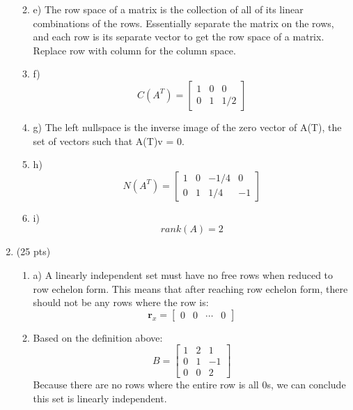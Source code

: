 \documentclass[11pt]{article}
\begin{document}
\begin{enumerate}
\begin{enumerate}
        \vskip 06pt
        \item e) The row space of a matrix is the collection of all of its linear combinations of the rows. Essentially separate the matrix on the rows, and each row is its separate vector to get the row space of a matrix. Replace row with column for the column space. 

        \vskip 06pt
        \item f)
        $$
        C(A^{T}) = \begin{bmatrix} 1 & 0 & 0 \\  0 & 1 & 1/2 \end{bmatrix}
        $$
        
        \vskip 06pt
        \item g) The left nullspace is the inverse image of the zero vector of A(T), the set of vectors such that A(T)v = 0.
        
        \vskip 06pt
        \item h)
        $$
        N(A^{T}) = \begin{bmatrix} 1 & 0 & -1/4 & 0 \\ 0 & 1 & 1/4 & -1 \end{bmatrix}
        $$

        \vskip 06pt
        \item i) $$ rank(A) = 2$$

      \end{enumerate}


    \item \label{Problem_05} (25 pts)

      \begin{enumerate}

        \item a)
        A linearly independent set must have no free rows when reduced to row echelon form. This means that after reaching row echelon form, there should not be any rows where the row is:
        $$ \mathbf{r}_x = \begin{bmatrix} 0 & 0 & \cdots & 0 \end{bmatrix} $$

        \vskip 06pt
        \item 
        Based on the definition above:
        $$
        B = 
        \begin{bmatrix} 1 & 2 & 1 \\ 0 & 1 & -1 \\ 0 & 0 & 2 \end{bmatrix}
        $$
        Because there are no rows where the entire row is all 0s, we can conclude this set is linearly independent.
        

\end{enumerate}
\end{enumerate}
\end{document}
